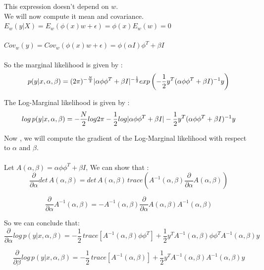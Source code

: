 \documentclass[12pt,twoside]{article}
\begin{document}
This expression doesn't depend on $w$.\\

We will now compute it mean and covariance.\\
$E_w(y|X) = E_w(\phi(x)w + \epsilon) = \phi(x)E_w(w) = 0$\\ \\
$Cov_w(y) = Cov_w(\phi(x)w + \epsilon) = \phi (\alpha I) \phi^T + \beta I$ \\ \\
So the marginal likelihood is given by : 
\begin{equation*}
p(y|x,\alpha, \beta) = (2 \pi)^{-\frac{N}{2}} \arrowvert \alpha\phi\phi^T + \beta I \arrowvert^{-\frac{1}{2}} exp\left( -\frac{1}{2} y^T (\alpha\phi\phi^T + \beta I)^{-1} y\right)
\end{equation*}

The Log-Marginal likelihood is given by :
\begin{equation*}
log \, p(y|x,\alpha, \beta) = -\frac{N}{2} log 2\pi - \frac{1}{2}log\arrowvert \alpha\phi\phi^T + \beta I \arrowvert - \frac{1}{2} y^T (\alpha\phi\phi^T + \beta I)^{-1} y
\end{equation*}

Now , we will compute the gradient of the Log-Marginal likelihood with respect to $\alpha$ and $\beta$. \\\\
Let $A(\alpha,\beta) = \alpha\phi\phi^T + \beta I$, We can show that : 
\begin{equation*}
\frac{\partial}{\partial \alpha} det\, A(\alpha,\beta) = det\,A(\alpha,\beta) \,trace \left(A^{-1}(\alpha,\beta) \frac{\partial}{\partial \alpha}A(\alpha,\beta)\right)
\end{equation*}

\begin{equation*}
\frac{\partial}{\partial \alpha} A^{-1}(\alpha,\beta) = - A^{-1}(\alpha,\beta) \frac{\partial}{\partial \alpha} A(\alpha,\beta) A^{-1}(\alpha,\beta) 
\end{equation*}

So we can conclude that:
\begin{equation*}
\frac{\partial}{\partial \alpha} log \, p(y|x,\alpha, \beta) = -\frac{1}{2} \, trace \left[A^{-1}(\alpha,\beta) \phi \phi^T\right] + \frac{1}{2} y^T  A^{-1}(\alpha,\beta) \phi \phi^T A^{-1}(\alpha,\beta) y
\end{equation*}

\begin{equation*}
\frac{\partial}{\partial \beta} log \, p(y|x,\alpha, \beta) = -\frac{1}{2} \, trace \left[A^{-1}(\alpha,\beta)\right] + \frac{1}{2} y^T  A^{-1}(\alpha,\beta) A^{-1}(\alpha,\beta) y
\end{equation*}
\end{document}
